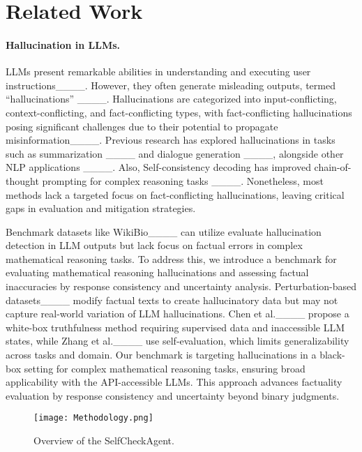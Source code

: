 \section{Related Work}
\paragraph{Hallucination in LLMs.}

LLMs present remarkable abilities in understanding and executing user instructions____. However, they often generate misleading outputs, termed \textrm{``hallucinations''}
____. Hallucinations are categorized into input-conflicting, context-conflicting, and fact-conflicting types, with fact-conflicting hallucinations posing significant challenges due to their potential to propagate misinformation____. Previous research has explored hallucinations in tasks such as summarization ____ and dialogue generation ____, alongside other NLP applications ____. Also, Self-consistency decoding has improved chain-of-thought prompting for complex reasoning tasks ____. Nonetheless, most methods lack a targeted focus on fact-conflicting hallucinations, leaving critical gaps in evaluation and mitigation strategies.

Benchmark datasets like WikiBio____ can utilize evaluate hallucination detection in LLM outputs but lack focus on factual errors in complex mathematical reasoning tasks. To address this, we introduce a benchmark for evaluating mathematical reasoning hallucinations and assessing factual inaccuracies by response consistency and uncertainty analysis. Perturbation-based datasets____  modify factual texts to create hallucinatory data but may not capture real-world variation of LLM hallucinations. Chen et al.____ propose a white-box truthfulness method requiring supervised data and inaccessible LLM states, while Zhang et al.____ use self-evaluation, which limits generalizability across tasks and domain. Our benchmark is targeting hallucinations in a black-box setting for complex mathematical reasoning tasks, ensuring broad applicability with the API-accessible LLMs. This approach advances factuality evaluation by response consistency and uncertainty beyond binary judgments.



\begin{figure*}[h]
    \centering
    \texttt{[image: Methodology.png]}
    \caption{Overview of the SelfCheckAgent.}
    \label{fig:Selfcheckagent}
\end{figure*}



